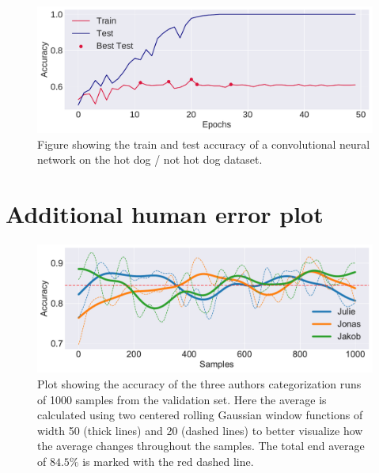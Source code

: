 \documentclass[10pt, twocolumn]{article}
\begin{document}
\begin{appendices}
\begin{figure}[H]
    \centering
    \includegraphics[scale=0.4]{../figs/hotdog_epochs.pdf}
    \caption{Figure showing the train and test accuracy of a convolutional neural network on the hot dog / not hot dog dataset.}
    \label{fig:hotdog_epochs}
\end{figure}

\section{Additional human error plot}\label{abend:human_error}

\begin{figure}[H]
    \centering
    \includegraphics[scale=0.4]{figs/human_window.pdf}
    \caption{Plot showing the accuracy of the three authors categorization runs of 1000 samples from the validation set. Here the average is calculated using two centered rolling Gaussian window functions of width 50 (thick lines) and 20 (dashed lines) to better visualize how the average changes throughout the samples. The total end average of $84.5\%$ is marked with the red dashed line.}
    \label{fig:human_window}
\end{figure}

\end{appendices}
\end{document}
